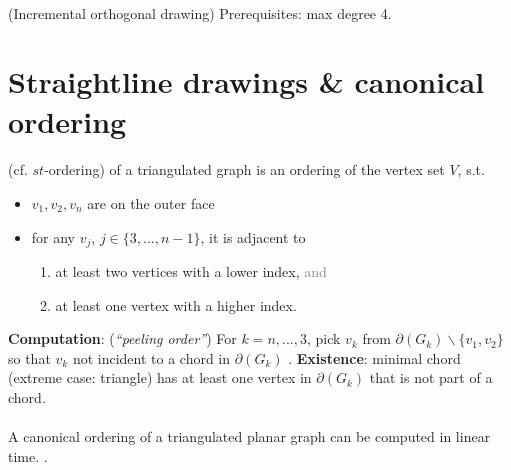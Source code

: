 \documentclass[10pt,twocolumn]{article}
\begin{document}
\paragraph{ } (Incremental orthogonal drawing) Prerequisites: max
degree 4.


\setcounter{section}{7}
\section{Straightline drawings \& canonical ordering}


\paragraph{} (cf. $st$-ordering) of a triangulated graph
is an ordering of the vertex set $V$, s.t.
\begin{itemize}
\item $v_1, v_2, v_n$ are on the outer face
\item for any $v_j$, $j \in \{3, ..., n-1\}$, it is adjacent to
  \begin{enumerate}
  \item at least two vertices with a lower index, \textcolor{gray}{and}
  \item at least one vertex with a higher index.
  \end{enumerate}
\end{itemize}
\textbf{Computation}: (\textit{``peeling order''}) For $k=n, ..., 3$, pick $v_k$ from
$\partial(G_k) \backslash \{v_1, v_2\}$ so that $v_k$ not incident to a chord in
$\partial(G_k)$ . \textbf{Existence}: minimal chord (extreme case: triangle) has at
least one vertex in $\partial(G_k)$ that is not part of a chord.

\paragraph{} A canonical ordering of a triangulated planar graph can
be computed in linear time. .
\\
\end{document}
